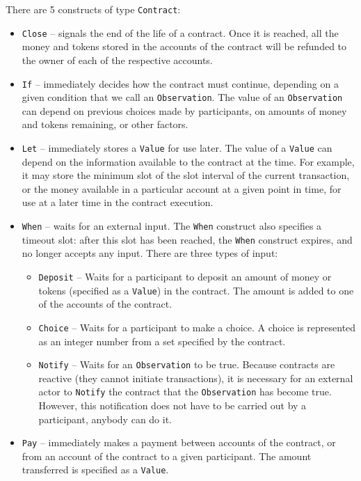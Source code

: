 \documentclass[english,runningheads]{llncs}
\begin{document}
There are 5 constructs of type \texttt{Contract}:
\begin{itemize}
\item \texttt{Close} -- signals the end of the life of a contract. Once
it is reached, all the money and tokens stored in the accounts of
the contract will be refunded to the owner of each of the respective
accounts.
\item \texttt{If} -- immediately decides how the contract must continue,
depending on a given condition that we call an \texttt{Observation}.
The value of an \texttt{Observation} can depend on previous choices
made by participants, on amounts of money and tokens remaining, or
other factors.
\item \texttt{Let} -- immediately stores a \texttt{Value} for use later.
The value of a \texttt{Value} can depend on the information available
to the contract at the time. For example, it may store the minimum
slot of the slot interval of the current transaction, or the money
available in a particular account at a given point in time, for use
at a later time in the contract execution.
\item \texttt{When} -- waits for an external input. The \texttt{When} construct
also specifies a timeout slot: after this slot has been reached, the
\texttt{When} construct expires, and no longer accepts any input.
There are three types of input:
\begin{itemize}
\item \texttt{Deposit} -- Waits for a participant to deposit an amount
of money or tokens (specified as a \texttt{Value}) in the contract.
The amount is added to one of the accounts of the contract.
\item \texttt{Choice} -- Waits for a participant to make a choice. A choice
is represented as an integer number from a set specified by the contract.
\item \texttt{Notify} -- Waits for an \texttt{Observation} to be true.
Because contracts are reactive (they cannot initiate transactions),
it is necessary for an external actor to \texttt{Notify} the contract
that the \texttt{Observation} has become true. However, this notification
does not have to be carried out by a participant, anybody can do it.
\end{itemize}
\item \texttt{Pay} -- immediately makes a payment between accounts of the
contract, or from an account of the contract to a given participant.
The amount transferred is specified as a \texttt{Value}. 
\end{itemize}
\end{document}
